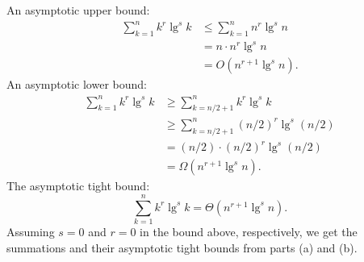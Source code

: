 An asymptotic upper bound:
\begin{align*}
    \sum_{k=1}^nk^r \lg^sk &\le \sum_{k=1}^nn^r\lg^sn \\
    &= n\cdot n^r \lg^sn \\
    &= O(n^{r+1}\lg^sn).
\end{align*}
An asymptotic lower bound:
\begin{align*}
    \sum_{k=1}^nk^r\lg^sk &\ge \sum_{k=n/2+1}^nk^r\lg^sk \\
    &\ge \sum_{k=n/2+1}^n(n/2)^r\lg^s(n/2) \\
    &= (n/2)\cdot(n/2)^r\lg^s(n/2) \\
    &= \Omega(n^{r+1}\lg^sn).
\end{align*}
The asymptotic tight bound:
\[
    \sum_{k=1}^nk^r\lg^sk = \Theta(n^{r+1}\lg^sn).
\]
Assuming $s=0$ and $r=0$ in the bound above, respectively, we get the summations and their asymptotic tight bounds from parts (a) and (b).
